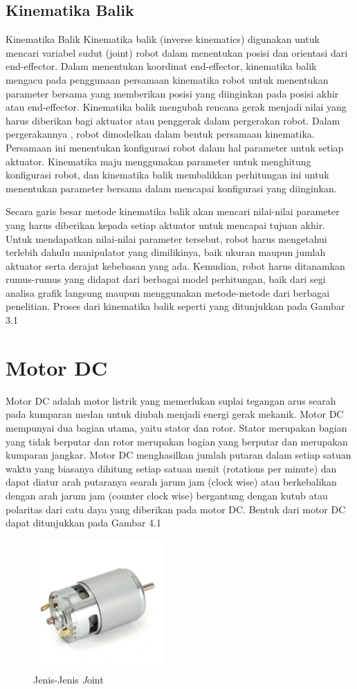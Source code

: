 \subsection{Kinematika Balik}
Kinematika Balik Kinematika balik (inverse kinematics) digunakan untuk mencari variabel sudut (joint) robot dalam menentukan posisi dan orientasi dari end-effector. Dalam menentukan koordinat end-effector, kinematika balik mengacu pada penggunaan persamaan kinematika robot untuk menentukan parameter bersama yang memberikan posisi yang diinginkan pada posisi akhir atau end-effector. Kinematika balik mengubah rencana gerak menjadi nilai yang harus diberikan bagi aktuator atau penggerak dalam pergerakan robot.  Dalam pergerakannya , robot dimodelkan dalam bentuk persamaan kinematika. Persamaan ini menentukan konfigurasi robot dalam hal parameter untuk setiap aktuator. Kinematika maju menggunakan parameter untuk menghitung konfigurasi robot, dan kinematika balik membalikkan perhitungan ini untuk menentukan parameter bersama dalam mencapai konfigurasi yang diinginkan. 

Secara garis besar metode kinematika balik akan mencari nilai-nilai parameter yang harus diberikan kepada setiap aktuator untuk mencapai tujuan akhir. Untuk mendapatkan nilai-nilai parameter tersebut, robot harus mengetahui terlebih dahulu manipulator yang dimilikinya, baik ukuran maupun jumlah aktuator serta derajat kebebasan yang ada. Kemudian, robot harus ditanamkan rumus-rumus yang didapat dari berbagai model perhitungan, baik dari segi analisa grafik langsung maupun menggunakan metode-metode dari berbagai penelitian. Proses dari kinematika balik seperti yang ditunjukkan pada Gambar 3.1

\section{Motor DC}
Motor DC adalah motor listrik yang memerlukan suplai tegangan arus searah pada kumparan medan untuk diubah menjadi energi gerak mekanik. Motor DC mempunyai dua bagian utama, yaitu stator dan rotor. Stator merupakan bagian yang tidak berputar dan rotor merupakan bagian yang berputar dan merupakan kumparan jangkar. Motor DC menghasilkan jumlah putaran dalam setiap satuan waktu yang biasanya dihitung setiap satuan menit (rotations per minute) dan dapat diatur arah putaranya searah jarum jam (clock wise) atau berkebalikan dengan arah jarum jam (counter clock wise) bergantung dengan kutub atau polaritas dari catu daya yang diberikan pada motor DC. Bentuk dari motor DC dapat ditunjukkan pada Gambar 4.1
	\begin{figure}[H]
	\centering
	\includegraphics[width=5cm]{gambar/motorDC.jpeg}
	\caption{Jenis-Jenis \emph Joint}
\end{figure}


